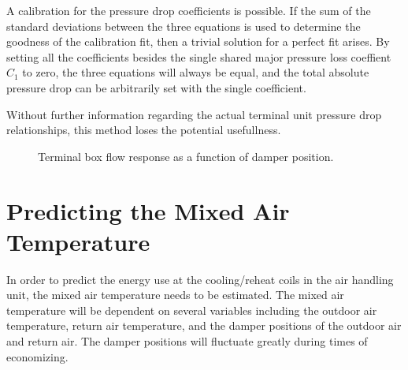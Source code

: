 A calibration for the pressure drop coefficients is possible. If the sum of the standard deviations between the three equations is used to determine the goodness of the calibration fit, then a trivial solution for a perfect fit arises. By setting all the coefficients besides the single shared major pressure loss coeffient \(C_1\) to zero, the three equations will always be equal, and the total absolute pressure drop can be arbitrarily set with the single coefficient. 

Without further information regarding the actual terminal unit pressure drop relationships, this method loses the potential usefullness.  


\begin{figure}
\centering
{}
\caption{Terminal box flow response as a function of damper position.}
\label{fig:flowVersusDamperPos}
\end{figure}


\section{Predicting the Mixed Air Temperature}

In order to predict the energy use at the cooling/reheat coils in the air handling unit, the mixed air temperature needs to be estimated. The mixed air temperature will be dependent on several variables including the outdoor air temperature, return air temperature, and the damper positions of the outdoor air and return air. The damper positions will fluctuate greatly during times of economizing.  


